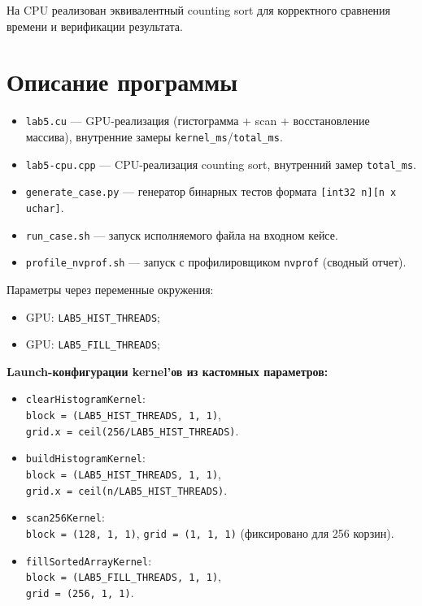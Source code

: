 \documentclass[a4paper,14pt]{extarticle}
\begin{document}
На CPU реализован эквивалентный counting sort для корректного сравнения
времени и верификации результата.

\section*{Описание программы}
\begin{itemize}
    \item \texttt{lab5.cu} --- GPU-реализация (гистограмма + scan + восстановление массива),
    внутренние замеры \texttt{kernel\_ms}/\texttt{total\_ms}.
    \item \texttt{lab5-cpu.cpp} --- CPU-реализация counting sort,
    внутренний замер \texttt{total\_ms}.
    \item \texttt{generate\_case.py} --- генератор бинарных тестов
    формата \texttt{[int32 n][n x uchar]}.
    \item \texttt{run\_case.sh} --- запуск исполняемого файла на входном кейсе.
    \item \texttt{profile\_nvprof.sh} --- запуск с профилировщиком
    \texttt{nvprof} (сводный отчет).
\end{itemize}

Параметры через переменные окружения:
\begin{itemize}
    \item GPU: \texttt{LAB5\_HIST\_THREADS};
    \item GPU: \texttt{LAB5\_FILL\_THREADS};
\end{itemize}

\textbf{Launch-конфигурации kernel'ов из кастомных параметров:}
\begin{itemize}
    \item \texttt{clearHistogramKernel}:\\
    \texttt{block = (LAB5\_HIST\_THREADS, 1, 1)},\\
    \texttt{grid.x = ceil(256/LAB5\_HIST\_THREADS)}.
    \item \texttt{buildHistogramKernel}:\\
    \texttt{block = (LAB5\_HIST\_THREADS, 1, 1)},\\
    \texttt{grid.x = ceil(n/LAB5\_HIST\_THREADS)}.
    \item \texttt{scan256Kernel}:\\
    \texttt{block = (128, 1, 1)}, \texttt{grid = (1, 1, 1)} (фиксировано для 256 корзин).
    \item \texttt{fillSortedArrayKernel}:\\
    \texttt{block = (LAB5\_FILL\_THREADS, 1, 1)},\\
    \texttt{grid = (256, 1, 1)}.
\end{itemize}
\end{document}
